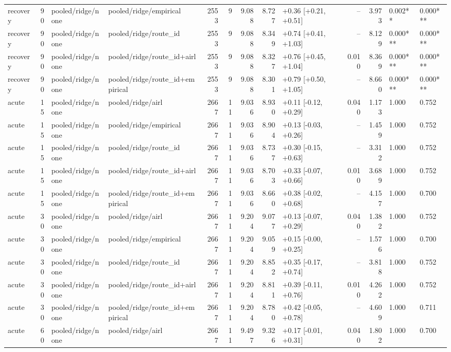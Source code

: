 \begin{tabular}{lrllrrrrlrrll}
recovery & 90 & pooled/ridge/none & pooled/ridge/empirical & 2553 & 9 & 9.088 & 8.727 & +0.36 [+0.21, +0.51] & -- & 3.973 & 0.002** & 0.000*** \\
recovery & 90 & pooled/ridge/none & pooled/ridge/route_id & 2553 & 9 & 9.088 & 8.349 & +0.74 [+0.41, +1.03] & -- & 8.129 & 0.000*** & 0.000*** \\
recovery & 90 & pooled/ridge/none & pooled/ridge/route_id+airl & 2553 & 9 & 9.088 & 8.327 & +0.76 [+0.45, +1.04] & 0.010 & 8.369 & 0.000*** & 0.000*** \\
recovery & 90 & pooled/ridge/none & pooled/ridge/route_id+empirical & 2553 & 9 & 9.088 & 8.301 & +0.79 [+0.50, +1.05] & -- & 8.660 & 0.000*** & 0.000*** \\
acute & 15 & pooled/ridge/none & pooled/ridge/airl & 2667 & 11 & 9.036 & 8.930 & +0.11 [-0.12, +0.29] & 0.040 & 1.173 & 1.000 & 0.752 \\
acute & 15 & pooled/ridge/none & pooled/ridge/empirical & 2667 & 11 & 9.036 & 8.904 & +0.13 [-0.03, +0.26] & -- & 1.459 & 1.000 & 0.752 \\
acute & 15 & pooled/ridge/none & pooled/ridge/route_id & 2667 & 11 & 9.036 & 8.737 & +0.30 [-0.15, +0.63] & -- & 3.312 & 1.000 & 0.752 \\
acute & 15 & pooled/ridge/none & pooled/ridge/route_id+airl & 2667 & 11 & 9.036 & 8.703 & +0.33 [-0.07, +0.66] & 0.010 & 3.689 & 1.000 & 0.752 \\
acute & 15 & pooled/ridge/none & pooled/ridge/route_id+empirical & 2667 & 11 & 9.036 & 8.660 & +0.38 [-0.02, +0.68] & -- & 4.157 & 1.000 & 0.700 \\
acute & 30 & pooled/ridge/none & pooled/ridge/airl & 2667 & 11 & 9.204 & 9.077 & +0.13 [-0.07, +0.29] & 0.040 & 1.382 & 1.000 & 0.752 \\
acute & 30 & pooled/ridge/none & pooled/ridge/empirical & 2667 & 11 & 9.204 & 9.059 & +0.15 [-0.00, +0.25] & -- & 1.576 & 1.000 & 0.700 \\
acute & 30 & pooled/ridge/none & pooled/ridge/route_id & 2667 & 11 & 9.204 & 8.852 & +0.35 [-0.17, +0.74] & -- & 3.818 & 1.000 & 0.752 \\
acute & 30 & pooled/ridge/none & pooled/ridge/route_id+airl & 2667 & 11 & 9.204 & 8.811 & +0.39 [-0.11, +0.76] & 0.010 & 4.262 & 1.000 & 0.752 \\
acute & 30 & pooled/ridge/none & pooled/ridge/route_id+empirical & 2667 & 11 & 9.204 & 8.780 & +0.42 [-0.05, +0.78] & -- & 4.609 & 1.000 & 0.711 \\
acute & 60 & pooled/ridge/none & pooled/ridge/airl & 2667 & 11 & 9.497 & 9.326 & +0.17 [-0.01, +0.31] & 0.040 & 1.802 & 1.000 & 0.700 \\

\end{tabular}
